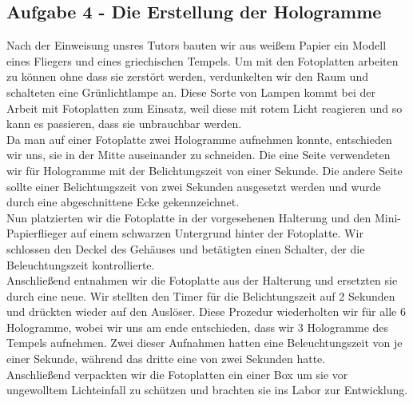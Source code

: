 \subsection*{Aufgabe 4 - Die Erstellung der Hologramme}
Nach der Einweisung unsres Tutors bauten wir aus weißem Papier ein Modell eines Fliegers und eines griechischen Tempels. 
Um mit den Fotoplatten arbeiten zu können ohne dass sie zerstört werden,  verdunkelten wir den Raum und schalteten eine Grünlichtlampe an. Diese Sorte von Lampen kommt bei der Arbeit mit Fotoplatten zum Einsatz, weil diese mit rotem Licht reagieren und so kann es passieren, dass sie unbrauchbar werden.\\
Da man auf einer Fotoplatte zwei Hologramme aufnehmen konnte, entschieden wir uns, sie in der Mitte auseinander zu schneiden. Die eine Seite verwendeten wir für Hologramme mit der Belichtungszeit von einer Sekunde. Die andere Seite sollte einer Belichtungszeit von zwei Sekunden ausgesetzt werden und wurde durch eine abgeschnittene Ecke gekennzeichnet.\\
Nun platzierten wir die Fotoplatte in der vorgesehenen Halterung und den Mini-Papierflieger auf einem schwarzen Untergrund hinter der Fotoplatte. Wir schlossen den Deckel des Gehäuses und betätigten einen Schalter, der die Beleuchtungszeit kontrollierte.\\
Anschließend entnahmen wir die Fotoplatte aus der Halterung und ersetzten sie durch eine neue. Wir stellten den Timer für die Belichtungszeit auf 2 Sekunden und drückten wieder auf den Auslöser. Diese Prozedur wiederholten wir für alle 6 Hologramme, wobei wir uns am ende entschieden, dass wir 3 Hologramme des Tempels aufnehmen. Zwei dieser Aufnahmen hatten eine Beleuchtungszeit von je einer Sekunde, während das dritte eine von zwei Sekunden hatte.\\
Anschließend verpackten wir die Fotoplatten ein einer Box um sie vor ungewolltem Lichteinfall zu schützen und brachten sie ins Labor zur Entwicklung.